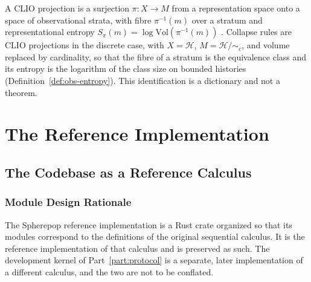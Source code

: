 \documentclass[12pt,oneside,openany]{book}
\theoremstyle{spherepop}
\theoremstyle{remarkstyle}
\newcommand{\calH}{\mathcal{H}}
\begin{document}
A CLIO projection is a surjection $\pi:X\to M$ from a representation space onto a space of observational strata, with fibre $\pi^{-1}(m)$ over a stratum and representational entropy $S_\pi(m)=\log\mathrm{Vol}(\pi^{-1}(m))$ \cite{clio}. Collapse rules are CLIO projections in the discrete case, with $X=\calH$, $M=\calH/{\sim_c}$, and volume replaced by cardinality, so that the fibre of a stratum is the equivalence class and its entropy is the logarithm of the class size on bounded histories (Definition~\ref{def:obs-entropy}). This identification is a dictionary and not a theorem.

\part{The Reference Implementation}

\chapter{The Codebase as a Reference Calculus}
\label{ch:codebase}

\section{Module Design Rationale}

The Spherepop reference implementation is a Rust crate organized so that its modules correspond to the definitions of the original sequential calculus. It is the reference implementation of that calculus and is preserved as such. The development kernel of Part~\ref{part:protocol} is a separate, later implementation of a different calculus, and the two are not to be conflated.
\end{document}
